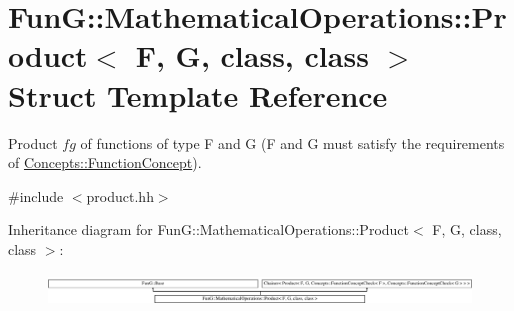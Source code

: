 \hypertarget{structFunG_1_1MathematicalOperations_1_1Product}{}\section{Fun\+G\+:\+:Mathematical\+Operations\+:\+:Product$<$ F, G, class, class $>$ Struct Template Reference}
\label{structFunG_1_1MathematicalOperations_1_1Product}


Product $fg$ of functions of type F and G (F and G must satisfy the requirements of \hyperlink{structFunG_1_1Concepts_1_1FunctionConcept}{Concepts\+::\+Function\+Concept}).  




{\ttfamily \#include $<$product.\+hh$>$}

Inheritance diagram for Fun\+G\+:\+:Mathematical\+Operations\+:\+:Product$<$ F, G, class, class $>$\+:\begin{figure}[H]
\begin{center}
\leavevmode
\includegraphics[height=0.864197cm]{structFunG_1_1MathematicalOperations_1_1Product}
\end{center}
\end{figure}

